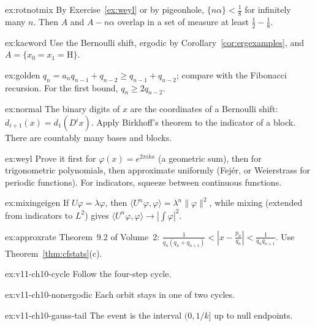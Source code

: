 \begin{hint}{ex:rotnotmix}
By Exercise~\ref{ex:weyl} or by pigeonhole, $\{n\alpha\}<\frac18$ for infinitely many $n$. Then $A$ and $A-n\alpha$ overlap in a set of measure at least $\frac12-\frac18$.
\end{hint}
\begin{hint}{ex:kacword}
Use the Bernoulli shift, ergodic by Corollary~\ref{cor:ergexamples}, and $A=\{x_0=x_1=\mathrm H\}$.
\end{hint}
\begin{hint}{ex:golden}
$q_n=a_nq_{n-1}+q_{n-2}\ge q_{n-1}+q_{n-2}$; compare with the Fibonacci recursion. For the first bound, $q_n\ge2q_{n-2}$.
\end{hint}
\begin{hint}{ex:normal}
The binary digits of $x$ are the coordinates of a Bernoulli shift: $d_{i+1}(x)=d_1(D^ix)$. Apply Birkhoff's theorem to the indicator of a block. There are countably many bases and blocks.
\end{hint}
\begin{hint}{ex:weyl}
Prove it first for $\varphi(x)=e^{2\pi ikx}$ (a geometric sum), then for trigonometric polynomials, then approximate uniformly (Fej\'er, or Weierstrass for periodic functions). For indicators, squeeze between continuous functions.
\end{hint}
\begin{hint}{ex:mixingeigen}
If $U\varphi=\lambda\varphi$, then $\langle U^n\varphi,\varphi\rangle=\lambda^n\|\varphi\|^2$, while mixing (extended from indicators to $L^2$) gives $\langle U^n\varphi,\varphi\rangle\to|\int\varphi|^2$.
\end{hint}
\begin{hint}{ex:approxrate}
Theorem~9.2 of Volume~2: $\frac1{q_n(q_n+q_{n+1})}<|x-\frac{p_n}{q_n}|<\frac1{q_nq_{n+1}}$. Use Theorem~\ref{thm:cfstats}(c).
\end{hint}

\begin{hint}{ex:v11-ch10-cycle}
Follow the four-step cycle.
\end{hint}

\begin{hint}{ex:v11-ch10-nonergodic}
Each orbit stays in one of two cycles.
\end{hint}

\begin{hint}{ex:v11-ch10-gauss-tail}
The event is the interval $(0,1/k]$ up to null endpoints.
\end{hint}

